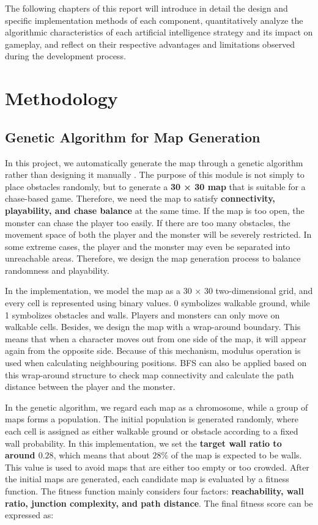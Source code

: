\documentclass[12pt,a4paper]{article}
\begin{document}
The following chapters of this report will introduce in detail the design and specific implementation methods of each component, quantitatively analyze the algorithmic characteristics of each artificial intelligence strategy and its impact on gameplay, and reflect on their respective advantages and limitations observed during the development process.

\section{Methodology}

\subsection{Genetic Algorithm for Map Generation}

In this project, we automatically generate the map through a genetic algorithm rather than designing it manually \cite{holland1975genetic,goldberg1989genetic}. The purpose of this module is not simply to place obstacles randomly, but to generate a \textbf{30 × 30 map} that is suitable for a chase-based game. Therefore, we need the map to satisfy \textbf{connectivity, playability, and chase balance} at the same time. If the map is too open, the monster can chase the player too easily. If there are too many obstacles, the movement space of both the player and the monster will be severely restricted. In some extreme cases, the player and the monster may even be separated into unreachable areas. Therefore, we design the map generation process to balance randomness and playability.

In the implementation, we model the map as a 30 × 30 two-dimensional grid, and every cell is represented using binary values. 0 symbolizes walkable ground, while 1 symbolizes obstacles and walls. Players and monsters can only move on walkable cells. Besides, we design the map with a wrap-around boundary. This means that when a character moves out from one side of the map, it will appear again from the opposite side. Because of this mechanism, modulus operation is used when calculating neighbouring positions. BFS can also be applied based on this wrap-around structure to check map connectivity and calculate the path distance between the player and the monster.

In the genetic algorithm, we regard each map as a chromosome, while a group of maps forms a population. The initial population is generated randomly, where each cell is assigned as either walkable ground or obstacle according to a fixed wall probability. In this implementation, we set the \textbf{target wall ratio to around $0.28$}, which means that about $28\%$ of the map is expected to be walls. This value is used to avoid maps that are either too empty or too crowded.
After the initial maps are generated, each candidate map is evaluated by a fitness function. The fitness function mainly considers four factors: \textbf{reachability, wall ratio, junction complexity, and path distance}. The final fitness score can be expressed as:
\end{document}
